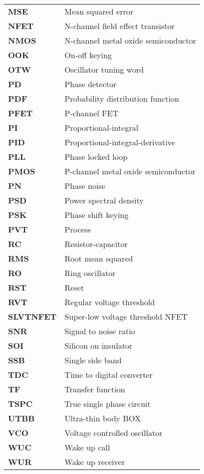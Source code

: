 	\begin{table}[htb!]
	\renewcommand*{\arraystretch}{1.30}\large
	\begin{tabular}{@{}ll}
		\textbf{\textsf{MSE}}	&	Mean squared error \\
		\textbf{\textsf{NFET}}	&	N-channel field effect transistor \\
		\textbf{\textsf{NMOS}}	&	N-channel metal oxide semiconductor \\
		\textbf{\textsf{OOK}}	&	On-off keying \\
		\textbf{\textsf{OTW}}	&	Oscillator tuning word \\
		\textbf{\textsf{PD}}	&	Phase detector \\
		\textbf{\textsf{PDF}}	&	Probability distribution function \\
		\textbf{\textsf{PFET}}	&	P-channel FET \\
		\textbf{\textsf{PI}}	&	Proportional-integral \\
		\textbf{\textsf{PID}}	&	Proportional-integral-derivative \\
		\textbf{\textsf{PLL}}	&	Phase locked loop \\
		\textbf{\textsf{PMOS}}	&	P-channel metal oxide semiconductor \\
		\textbf{\textsf{PN}}	&	Phase noise \\
		\textbf{\textsf{PSD}}	&	Power spectral density \\
		\textbf{\textsf{PSK}}	&	Phase shift keying \\
		\textbf{\textsf{PVT}}	&	Process \\
		\textbf{\textsf{RC}}	&	Resistor-capacitor \\
		\textbf{\textsf{RMS}}	&	Root mean squared \\
		\textbf{\textsf{RO}}	&	Ring oscillator \\
		\textbf{\textsf{RST}}	&	Reset \\
		\textbf{\textsf{RVT}}	&	Regular voltage threshold \\
		\textbf{\textsf{SLVTNFET}}	&	Super-low voltage threshold NFET \\
		\textbf{\textsf{SNR}}	&	Signal to noise ratio \\
		\textbf{\textsf{SOI}}	&	Silicon on insulator \\
		\textbf{\textsf{SSB}}	&	Single side band \\
		\textbf{\textsf{TDC}}	&	Time to digital converter \\
		\textbf{\textsf{TF}}	&	Transfer function \\
		\textbf{\textsf{TSPC}}	&	True single phase circuit \\
		\textbf{\textsf{UTBB}}	&	Ultra-thin body BOX \\
		\textbf{\textsf{VCO}}	&	Voltage controlled oscillator \\
		\textbf{\textsf{WUC}}	&	Wake up call \\
		\textbf{\textsf{WUR}}	&	Wake up receiver \\
	\end{tabular}
	\end{table}

